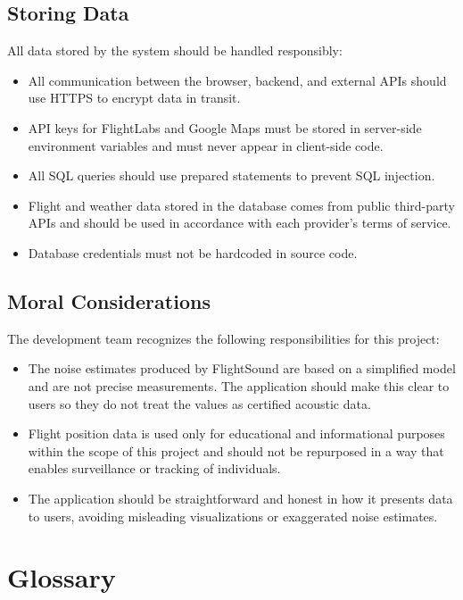 \documentclass[12pt]{article}
\begin{document}
\subsection{Storing Data}
All data stored by the system should be handled responsibly:

\begin{itemize}
\item All communication between the browser, backend, and external APIs should use HTTPS to encrypt data in transit.
\item API keys for FlightLabs and Google Maps must be stored in server-side environment variables and must never appear in client-side code.
\item All SQL queries should use prepared statements to prevent SQL injection.
\item Flight and weather data stored in the database comes from public third-party APIs and should be used in accordance with each provider's terms of service.
\item Database credentials must not be hardcoded in source code.
\end{itemize}

\subsection{Moral Considerations}
The development team recognizes the following responsibilities for this project:

\begin{itemize}
\item The noise estimates produced by FlightSound are based on a simplified model and are not precise measurements. The application should make this clear to users so they do not treat the values as certified acoustic data.
\item Flight position data is used only for educational and informational purposes within the scope of this project and should not be repurposed in a way that enables surveillance or tracking of individuals.
\item The application should be straightforward and honest in how it presents data to users, avoiding misleading visualizations or exaggerated noise estimates.
\end{itemize}

\newpage

\section{Glossary}
\end{document}
